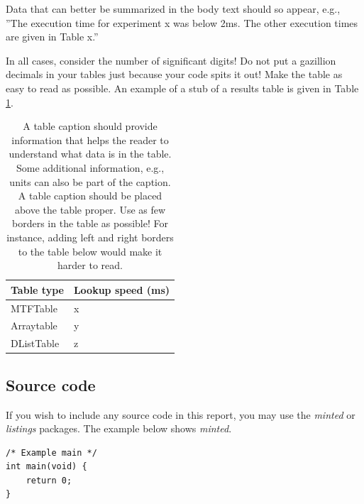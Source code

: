 \documentclass[10pt, titlepage, oneside, a4paper]{article}
\begin{document}
Data that can better be summarized in the body text should so appear,
e.g., ''The execution time for experiment x was below 2ms. The other
execution times are given in Table x.''

In all cases, consider the number of significant digits! Do not put a
gazillion decimals in your tables just because your code spits it out!
Make the table as easy to read as possible. An example of a stub of a
results table is given in Table \ref{tab:time-table}.

\begin{table}[tbp]
\caption{\label{tab:time-table}A table caption should provide information that helps the reader to understand what data is in the table. Some additional information, e.g., units can also be part of the caption. A table caption should be placed above the table proper. Use as few borders in the table as possible! For instance, adding left and right borders to the table below would make it harder to read.}
\centering
\begin{tabular}{l|l}
\textbf{Table type} & Lookup speed (ms)\\
\hline
MTFTable & x\\
Arraytable & y\\
DListTable & z\\
\end{tabular}
\end{table}

\subsection{Source code}
\label{app:source-code}
If you wish to include any source code in this report, you may use the
\emph{minted} or \emph{listings} packages. The example below shows \emph{minted}.

\begin{verbatim}
/* Example main */
int main(void) {
    return 0;
}
\end{verbatim}
\end{document}
